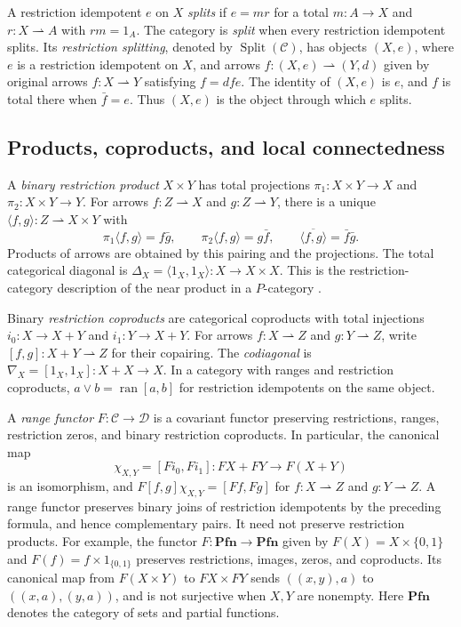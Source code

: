 \documentclass[11pt]{article}
\newcommand{\Pfn}{\mathbf{Pfn}}
\newcommand{\ran}{\operatorname{ran}}
\begin{document}
A restriction idempotent $e$ on $X$ \emph{splits} if
$e=mr$ for a total $m:A\to X$ and $r:X\rightharpoonup A$
with $rm=1_A$. The category is \emph{split} when every restriction
idempotent splits.
Its \emph{restriction splitting}, denoted by
$\operatorname{Split}(\mathcal C)$, has objects $(X,e)$, where $e$ is a
restriction idempotent on $X$, and arrows
$f:(X,e)\rightharpoonup(Y,d)$ given by original arrows
$f:X\rightharpoonup Y$ satisfying $f=dfe$.
The identity of $(X,e)$ is $e$, and $f$ is total there when
$\bar f=e$. Thus $(X,e)$ is the object through which $e$ splits.

\subsection{Products, coproducts, and local connectedness}

A \emph{binary restriction product} $X\times Y$ has total
projections $\pi_1:X\times Y\to X$ and $\pi_2:X\times Y\to Y$.
For arrows $f:Z\rightharpoonup X$ and $g:Z\rightharpoonup Y$,
there is a unique $\langle f,g\rangle:Z\rightharpoonup X\times Y$
with
\[
 \pi_1\langle f,g\rangle=f\bar g,\qquad
 \pi_2\langle f,g\rangle=g\bar f,\qquad
 \overline{\langle f,g\rangle}=\bar f\bar g.
\]
Products of arrows are obtained by this pairing and the projections.
The total categorical diagonal is
$\Delta_X=\langle1_X,1_X\rangle:X\to X\times X$.
This is the restriction-category description of the near product
in a $P$-category \cite{Rosolini,CockettLack}.

Binary \emph{restriction coproducts} are categorical coproducts with
total injections $i_0:X\to X+Y$ and $i_1:Y\to X+Y$.
For arrows $f:X\rightharpoonup Z$ and $g:Y\rightharpoonup Z$,
write $[f,g]:X+Y\rightharpoonup Z$ for their copairing.
The \emph{codiagonal} is
$\nabla_X=[1_X,1_X]:X+X\to X$.
In a category with ranges and restriction coproducts,
$a\vee b=\ran[a,b]$ for restriction idempotents on the same object.

A \emph{range functor} $F:\mathcal C\to\mathcal D$ is a covariant
functor preserving restrictions, ranges, restriction zeros, and binary
restriction coproducts. In particular, the canonical map
\[
 \chi_{X,Y}=[F i_0,F i_1]:FX+FY\longrightarrow F(X+Y)
\]
is an isomorphism, and
$F[f,g]\chi_{X,Y}=[Ff,Fg]$ for $f:X\rightharpoonup Z$ and
$g:Y\rightharpoonup Z$. A range functor preserves binary
joins of restriction idempotents by the preceding formula, and hence
complementary pairs.
It need not preserve restriction products. For example, the functor
$F:\Pfn\to\Pfn$ given by $F(X)=X\times\{0,1\}$ and
$F(f)=f\times1_{\{0,1\}}$ preserves restrictions, images, zeros,
and coproducts. Its canonical map from $F(X\times Y)$ to
$FX\times FY$ sends $((x,y),a)$ to $((x,a),(y,a))$, and is
not surjective when $X,Y$ are nonempty. Here $\Pfn$ denotes the
category of sets and partial functions.
\end{document}

